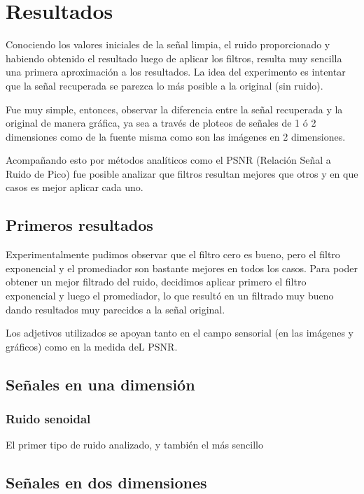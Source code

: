 \section{Resultados}

Conociendo los valores iniciales de la se\~nal limpia, el ruido proporcionado y
habiendo obtenido el resultado luego de aplicar los filtros, resulta muy
sencilla una primera aproximaci\'on a los resultados. La idea del experimento es
intentar que la se\~nal recuperada se parezca lo m\'as posible a la original
(sin ruido).

Fue muy simple, entonces, observar la diferencia entre la se\~nal recuperada y
la original de manera gr\'afica, ya sea a trav\'es de ploteos de se\~nales de 1
\'o 2 dimensiones como de la fuente misma como son las im\'agenes en 2
dimensiones.

Acompa\~nando esto por m\'etodos anal\'iticos como el PSNR (Relaci\'on Se\~nal a
Ruido de Pico) fue posible analizar que filtros resultan mejores que otros y en
que casos es mejor aplicar cada uno.

\subsection{Primeros resultados}

Experimentalmente pudimos observar que el filtro cero es bueno, pero el filtro 
exponencial y el promediador son bastante mejores en todos los casos. 
Para poder obtener un mejor filtrado del ruido, decidimos aplicar primero el 
filtro exponencial y luego el promediador, lo que result\'o en un filtrado muy 
bueno dando resultados muy parecidos a la se\~nal original. 

Los adjetivos utilizados se apoyan tanto en el campo sensorial (en las
im\'agenes y gr\'aficos) como en la medida deL PSNR. 

\subsection{Se\~nales en una dimensi\'on}

\subsubsection{Ruido senoidal}

El primer tipo de ruido analizado, y tambi\'en el m\'as sencillo 

\subsection{Se\~nales en dos dimensiones}

